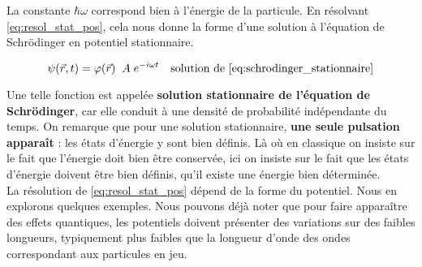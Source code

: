 \documentclass{book}
\begin{document}
La constante $\hbar \omega$ correspond bien à l'énergie de la particule. En résolvant \eqref{eq:resol_stat_pos}, cela nous donne la forme d'une solution à l'équation de Schrödinger en potentiel stationnaire.

\begin{equation}
\psi(\vec r, t) = \varphi(\vec r) \; \;  A \;e^{-i\omega t} \quad \text{solution de \eqref{eq:schrodinger_stationnaire}}
\end{equation}


Une telle fonction est appelée \textbf{solution stationnaire de l'équation de Schrödinger}, car elle conduit à une densité de probabilité indépendante du temps. On remarque que pour une solution stationnaire, \textbf{une seule pulsation apparaît} : les états d'énergie y sont bien définis. Là où en classique on insiste sur le fait que l'énergie doit bien être conservée, ici on insiste sur le fait que les états d'énergie doivent être bien définis, qu'il existe une énergie bien déterminée. \\

La résolution de \eqref{eq:resol_stat_pos} dépend de la forme du potentiel. Nous en explorons quelques exemples. Nous pouvons déjà noter que pour faire apparaître des effets quantiques, les potentiels doivent présenter des variations sur des faibles longueurs, typiquement plus faibles que la longueur d'onde des ondes correspondant aux particules en jeu.
\end{document}

